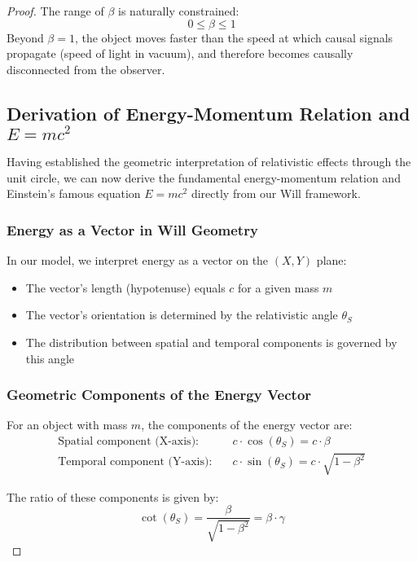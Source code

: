 \documentclass{article}
\begin{document}
\begin{theorem}
\begin{proof}
The range of \(\beta\) is naturally constrained:
\[
0 \leq \beta \leq 1
\]
Beyond \(\beta = 1\), the object moves faster than the speed at which causal signals propagate (speed of light in vacuum), and therefore becomes causally disconnected from the observer.

\subsection{Derivation of Energy-Momentum Relation and $E=mc^2$}

Having established the geometric interpretation of relativistic effects through the unit circle, we can now derive the fundamental energy-momentum relation and Einstein's famous equation $E=mc^2$ directly from our Will framework.

\subsubsection{Energy as a Vector in Will Geometry}

In our model, we interpret energy as a vector on the $(X,Y)$ plane:
\begin{itemize}
    \item The vector's length (hypotenuse) equals $c$ for a given mass $m$
    \item The vector's orientation is determined by the relativistic angle $\theta_S$
    \item The distribution between spatial and temporal components is governed by this angle
\end{itemize}

\subsubsection{Geometric Components of the Energy Vector}

For an object with mass $m$, the components of the energy vector are:
\begin{align}
    \text{Spatial component (X-axis):} & \quad c \cdot \cos(\theta_S) = c \cdot \beta \\
    \text{Temporal component (Y-axis):} & \quad c \cdot \sin(\theta_S) = c \cdot \sqrt{1-\beta^2}
\end{align}

The ratio of these components is given by:
\begin{equation}
    \cot(\theta_S) = \frac{\beta}{\sqrt{1-\beta^2}} = \beta \cdot \gamma
\end{equation}


\end{proof}
\end{theorem}
\end{document}
